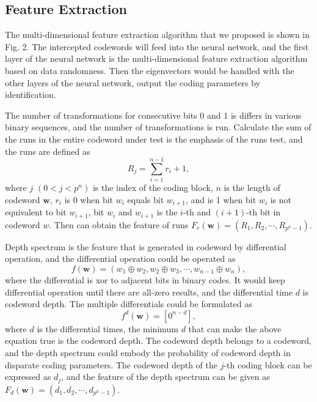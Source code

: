 \documentclass[conference]{IEEEtran}
\begin{document}
\subsection{Feature Extraction}
The multi-dimensional feature extraction algorithm that we proposed is shown in Fig. 2. The intercepted codewords will feed into the neural network, and the first layer of the neural network is the multi-dimensional feature extraction algorithm based on data randomness. Then the eigenvectors would be handled with the other layers of the neural network, output the coding parameters by identification.

The number of transformations for consecutive bits 0 and 1 is differs in various binary sequences, and the number of transformations is run. Calculate the sum of the runs in the entire codeword under test is the emphasis of the runs test, and the runs are defined as
\begin{equation}
	R_{j} = \sum_{i=1}^{n-1} r_i + 1,
\end{equation}
where $j$ $(0 < j < p^n)$ is the index of the coding block, $n$ is the length of codeword $\boldsymbol{w}$, $r_i$ is 0 when bit $w_i$ equals bit $w_{i + 1}$, and is 1 when bit $w_i$ is not equivalent to bit $w_{i + 1}$,  bit $w_i$ and $w_{i + 1}$ is the $i$-th and $(i + 1)$-th bit in codeword $w$. Then can obtain the feature of runs $F_r(\boldsymbol{w}) = (R_1, R_2, \cdots, R_{p^n - 1})$. 

Depth spectrum is the feature that is generated in codeword by differential operation, and the differential operation could be operated as
\begin{equation}
	f(\boldsymbol{w}) = (w_{1} \oplus w_{2}, w_{2} \oplus w_{3}, \cdots, w_{n - 1} \oplus w_{n}),
\end{equation}
where the differential is xor to adjacent bits in binary codes. It would keep differential operation until there are all-zero results, and the differential time $d$ is codeword depth. The multiple differentials could be formulated as
\begin{equation}
	f^{d}(\boldsymbol{w}) = [0^{n-d}],
\end{equation}
where $d$ is the differential times, the minimum $d$ that can make the above equation true is the codeword depth. The codeword depth belongs to a codeword, and the depth spectrum could embody the probability of codeword depth in disparate coding parameters. The codeword depth of the $j$-th coding block can be expressed as $d_j$, and the feature of the depth spectrum can be given as $F_d(\boldsymbol{w}) = (d_1, d_2, \cdots, d_{p^n - 1})$.
\end{document}
